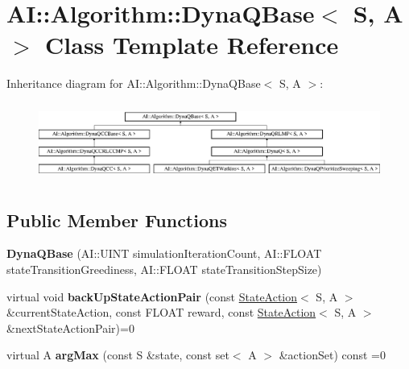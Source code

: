 \hypertarget{classAI_1_1Algorithm_1_1DynaQBase}{\section{A\-I\-:\-:Algorithm\-:\-:Dyna\-Q\-Base$<$ S, A $>$ Class Template Reference}
\label{classAI_1_1Algorithm_1_1DynaQBase}
}
Inheritance diagram for A\-I\-:\-:Algorithm\-:\-:Dyna\-Q\-Base$<$ S, A $>$\-:\begin{figure}[H]
\begin{center}
\leavevmode
\includegraphics[height=2.557078cm]{classAI_1_1Algorithm_1_1DynaQBase}
\end{center}
\end{figure}
\subsection*{Public Member Functions}
\begin{DoxyCompactItemize}
\item 
\hypertarget{classAI_1_1Algorithm_1_1DynaQBase_a089f4024fab2f19179dea637b7f6c8ee}{{\bfseries Dyna\-Q\-Base} (A\-I\-::\-U\-I\-N\-T simulation\-Iteration\-Count, A\-I\-::\-F\-L\-O\-A\-T state\-Transition\-Greediness, A\-I\-::\-F\-L\-O\-A\-T state\-Transition\-Step\-Size)}\label{classAI_1_1Algorithm_1_1DynaQBase_a089f4024fab2f19179dea637b7f6c8ee}

\item 
\hypertarget{classAI_1_1Algorithm_1_1DynaQBase_a0d5777706e9c2be04ee1834ad593c795}{virtual void {\bfseries back\-Up\-State\-Action\-Pair} (const \hyperlink{classAI_1_1StateAction}{State\-Action}$<$ S, A $>$ \&current\-State\-Action, const F\-L\-O\-A\-T reward, const \hyperlink{classAI_1_1StateAction}{State\-Action}$<$ S, A $>$ \&next\-State\-Action\-Pair)=0}\label{classAI_1_1Algorithm_1_1DynaQBase_a0d5777706e9c2be04ee1834ad593c795}

\item 
\hypertarget{classAI_1_1Algorithm_1_1DynaQBase_a32044f721ba4afbca5ea144b3f84135b}{virtual A {\bfseries arg\-Max} (const S \&state, const set$<$ A $>$ \&action\-Set) const =0}\label{classAI_1_1Algorithm_1_1DynaQBase_a32044f721ba4afbca5ea144b3f84135b}

\end{DoxyCompactItemize}
